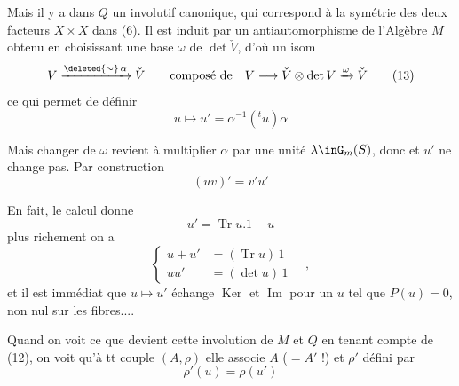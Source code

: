 Mais il y a dans $Q$ un  involutif canonique, qui correspond à la symétrie des deux facteurs $X\times X$ dans (6). Il est induit par un antiautomorphisme  de l'Algèbre $M$ obtenu  en choisissant  une \deleted{\unsure{$\omega$}} base $\omega$ de $\det\check V$, d'où un isom 
\[
 V\xrightarrow{\deleted{\sim}\,\alpha}\check V
 \qquad\text{composé de}\quad V\longrightarrow\check V\otimes\det V\xrightarrow{\omega}\check V
 \tag*{(13)}
\]
ce qui permet de définir
\[
 u\longmapsto u'=\alpha^{-1}({}^{t}u)\alpha\tag*{(14)}
\]

Mais changer de $\omega$ revient à multiplier $\alpha$ par une  unité $\lambda\inG_m(S)$, donc  et $u'$ ne change pas. Par construction
\[
 (uv)'=v'u' \tag*{(15)}
\]

En fait, le calcul donne
\[
 u'=\operatorname{Tr}u.1-u\tag*{(16)}
\]
plus richement on a
\[
 \left\{\begin{aligned}u+u'&=(\operatorname{Tr}u)\,1\\ uu'&=(\det u)\,1\end{aligned}\right. \quad,\tag*{(17)}
\]
et il est immédiat que $u\longmapsto u'$ échange $\operatorname{Ker}$ et $\operatorname{Im}$ pour un $u$ tel que $P(u)=0$,  non nul sur les fibres....

Quand on voit ce que devient cette involution de $M$ et $Q$ en tenant compte de (12), on voit qu'à tt couple $(A,\rho)$ elle associe $A$ ($=A'$ !) et $\rho'$ défini par
\[
 \rho'(u)=\rho(u')\tag*{(18)}
\]
